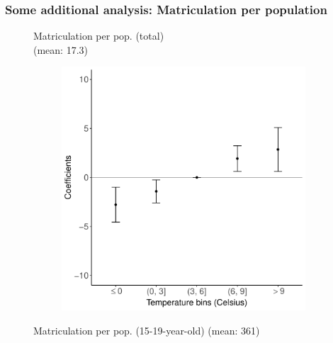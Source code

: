 \documentclass[10pt, pdfmx,hiresbb]{beamer}
\begin{document}
\begin{frame}\frametitle{Some additional analysis: Matriculation per population}
  \begin{figure}
    \begin{minipage}{0.44\textwidth}
      \begin{center}
        Matriculation per pop. (total) \\ (mean: 17.3)
      \end{center}
      \begin{figure}[h]
        \centering
        \includegraphics[width = \textwidth]{../Output/images/per_pop_reg_2.pdf}
      \end{figure}
    \end{minipage}
    \begin{minipage}{0.44\textwidth}
      \begin{center}
        Matriculation per pop. (15-19-year-old) (mean: 361)
      \end{center}
      \begin{figure}[h]

\end{figure}
\end{minipage}
\end{figure}
\end{frame}
\end{document}
